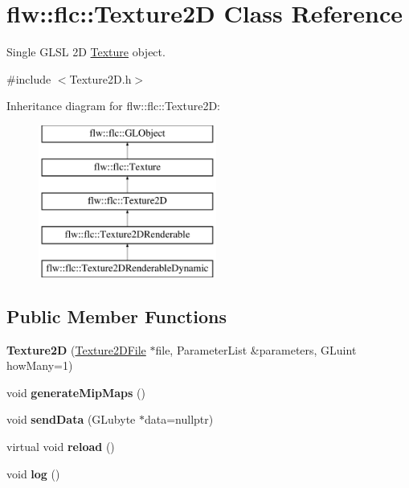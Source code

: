 \hypertarget{classflw_1_1flc_1_1Texture2D}{}\section{flw\+:\+:flc\+:\+:Texture2D Class Reference}
\label{classflw_1_1flc_1_1Texture2D}


Single G\+L\+SL 2D \hyperlink{classflw_1_1flc_1_1Texture}{Texture} object.  




{\ttfamily \#include $<$Texture2\+D.\+h$>$}

Inheritance diagram for flw\+:\+:flc\+:\+:Texture2D\+:\begin{figure}[H]
\begin{center}
\leavevmode
\includegraphics[height=5.000000cm]{classflw_1_1flc_1_1Texture2D}
\end{center}
\end{figure}
\subsection*{Public Member Functions}
\begin{DoxyCompactItemize}
\item 
{\bfseries Texture2D} (\hyperlink{classflw_1_1flc_1_1Texture2DFile}{Texture2\+D\+File} $\ast$file, Parameter\+List \&parameters, G\+Luint how\+Many=1)\hypertarget{classflw_1_1flc_1_1Texture2D_ac654103499013ec5ac498cf26a2ad92e}{}\label{classflw_1_1flc_1_1Texture2D_ac654103499013ec5ac498cf26a2ad92e}

\item 
void {\bfseries generate\+Mip\+Maps} ()\hypertarget{classflw_1_1flc_1_1Texture2D_a6812a5516385561270bd8bb19a0ca4be}{}\label{classflw_1_1flc_1_1Texture2D_a6812a5516385561270bd8bb19a0ca4be}

\item 
void {\bfseries send\+Data} (G\+Lubyte $\ast$data=nullptr)\hypertarget{classflw_1_1flc_1_1Texture2D_a1b6b3ce8d1ed95622eceb08a6782a5c5}{}\label{classflw_1_1flc_1_1Texture2D_a1b6b3ce8d1ed95622eceb08a6782a5c5}

\item 
virtual void {\bfseries reload} ()\hypertarget{classflw_1_1flc_1_1Texture2D_ac21252a694bd715602b460ab05241c3e}{}\label{classflw_1_1flc_1_1Texture2D_ac21252a694bd715602b460ab05241c3e}

\item 
void {\bfseries log} ()\hypertarget{classflw_1_1flc_1_1Texture2D_a3ad309d16e0f23fc5245d60d4b275c73}{}\label{classflw_1_1flc_1_1Texture2D_a3ad309d16e0f23fc5245d60d4b275c73}

\end{DoxyCompactItemize}
